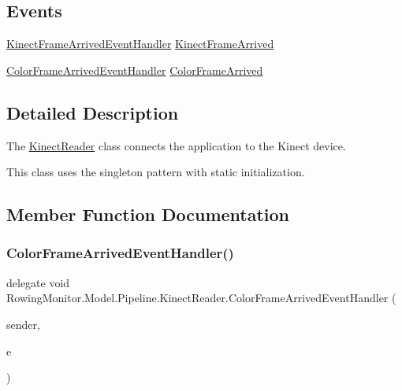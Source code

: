 \subsection*{Events}
\begin{DoxyCompactItemize}
\item 
\hyperlink{class_rowing_monitor_1_1_model_1_1_pipeline_1_1_kinect_reader_a324ac8a3e20e308a754f163e0925e95a}{Kinect\+Frame\+Arrived\+Event\+Handler} \hyperlink{class_rowing_monitor_1_1_model_1_1_pipeline_1_1_kinect_reader_a69f71477e3f769bab61917c3654b4965}{Kinect\+Frame\+Arrived}
\item 
\hyperlink{class_rowing_monitor_1_1_model_1_1_pipeline_1_1_kinect_reader_aefbafde39c2c91e3b57c1db7073198bc}{Color\+Frame\+Arrived\+Event\+Handler} \hyperlink{class_rowing_monitor_1_1_model_1_1_pipeline_1_1_kinect_reader_a5de5efaee2ef12948b7dfc6f8937b94d}{Color\+Frame\+Arrived}
\end{DoxyCompactItemize}


\subsection{Detailed Description}
The \hyperlink{class_rowing_monitor_1_1_model_1_1_pipeline_1_1_kinect_reader}{Kinect\+Reader} class connects the application to the Kinect device. 

This class uses the singleton pattern with static initialization. 

\subsection{Member Function Documentation}
\mbox{\label{class_rowing_monitor_1_1_model_1_1_pipeline_1_1_kinect_reader_aefbafde39c2c91e3b57c1db7073198bc}} 
\subsubsection{\texorpdfstring{Color\+Frame\+Arrived\+Event\+Handler()}{ColorFrameArrivedEventHandler()}}
{\footnotesize\ttfamily delegate void Rowing\+Monitor.\+Model.\+Pipeline.\+Kinect\+Reader.\+Color\+Frame\+Arrived\+Event\+Handler (\begin{DoxyParamCaption}\item[{Object}]{sender,  }\item[{\hyperlink{class_rowing_monitor_1_1_model_1_1_color_frame_arrived_event_args}{Color\+Frame\+Arrived\+Event\+Args}}]{e }\end{DoxyParamCaption})}

